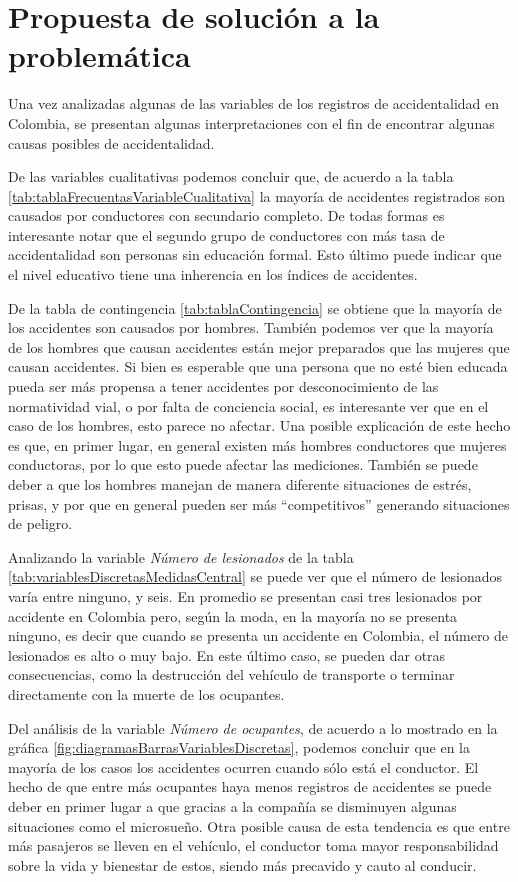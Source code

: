 \section*{Propuesta de solución a la problemática}
\label{sec:propuestaSolucion}
Una vez analizadas algunas de las variables de los registros de accidentalidad en Colombia, se presentan algunas interpretaciones con el fin de encontrar algunas causas posibles de accidentalidad.\par
De las variables cualitativas podemos concluir que, de acuerdo a la tabla \ref{tab:tablaFrecuentasVariableCualitativa} la mayoría de accidentes registrados son causados por conductores con secundario completo. De todas formas es interesante notar que el segundo grupo de conductores con más tasa de accidentalidad son personas sin educación formal. Esto último puede indicar que el nivel educativo tiene una inherencia en los índices de accidentes.\par
De la tabla de contingencia \ref{tab:tablaContingencia} se obtiene que la mayoría de los accidentes son causados por hombres. También podemos ver que la mayoría de los hombres que causan accidentes están mejor preparados que las mujeres que causan accidentes. Si bien es esperable que una persona que no esté bien educada pueda ser más propensa a tener accidentes por desconocimiento de las normatividad vial, o por falta de conciencia social, es interesante ver que en el caso de los hombres, esto parece no afectar. Una posible explicación de este hecho es que, en primer lugar, en general existen más hombres conductores que mujeres conductoras, por lo que esto puede afectar las mediciones. También se puede deber a que los hombres manejan de manera diferente situaciones de estrés, prisas, y por que en general pueden ser más “competitivos” generando situaciones de peligro.\par
Analizando la variable \emph{Número de lesionados} de la tabla \ref{tab:variablesDiscretasMedidasCentral} se puede ver que el número de lesionados varía entre ninguno, y seis. En promedio se presentan casi tres lesionados por accidente en Colombia pero, según la moda, en la mayoría no se presenta ninguno, es decir que cuando se presenta un accidente en Colombia, el número de lesionados es alto o muy bajo. En este último caso, se pueden dar otras consecuencias, como la destrucción del vehículo de transporte o terminar directamente con la muerte de los ocupantes.\par
Del análisis de la variable \emph{Número de ocupantes}, de acuerdo a lo mostrado en la gráfica \ref{fig:diagramasBarrasVariablesDiscretas}, podemos concluir que en la mayoría de los casos los accidentes ocurren cuando sólo está el conductor. El hecho de que entre más ocupantes haya menos registros de accidentes se puede deber en primer lugar a que gracias a la compañía se disminuyen algunas situaciones como el microsueño. Otra posible causa de esta tendencia es que entre más pasajeros se lleven en el vehículo, el conductor toma mayor responsabilidad sobre la vida y bienestar de estos, siendo más precavido y cauto al conducir.\par
